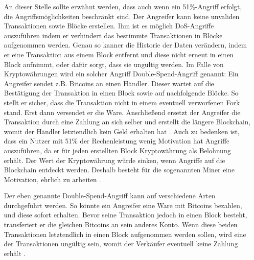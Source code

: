 An dieser Stelle sollte erwähnt werden, dass auch wenn ein 51\%-Angriff erfolgt, die Angriffsmöglichkeiten beschränkt sind. Der Angreifer kann keine unvaliden Transaktionen sowie Blöcke erstellen. Ihm ist es möglich DoS-Angriffe auszuführen indem er verhindert das bestimmte Transaktionen in Blöcke aufgenommen werden. Genau so kanner die Historie der Daten verändern, indem er eine Transaktion aus einem Block entfernt und diese nicht erneut in einen Block aufnimmt, oder dafür sorgt, dass sie ungültig werden. Im Falle von Kryptowährungen wird ein solcher Angriff Double-Spend-Angriff genannt: Ein Angreifer sendet z.B. Bitcoins an einen Händler. Dieser wartet auf die Bestätigung der Transaktion in einen Block sowie auf nachfolgende Blöcke. So stellt er sicher, dass die Transaktion nicht in einem eventuell verworfenen Fork stand. Erst dann versendet er die Ware. Anschließend ersetzt der Angreifer die Transaktion durch eine Zahlung an sich selber und erstellt die längere Blockchain, womit der Händler letztendlich kein Geld erhalten hat \cite{EthereumTeamEthereumWhitePaper2017}. Auch zu bedenken ist, dass ein Nutzer mit 51\% der Rechenleistung wenig Motivation hat Angriffe auszuführen, da er für jeden erstellten Block Kryptowährung als Belohnung erhält. Der Wert der Kryptowährung würde sinken, wenn Angriffe auf die Blockchain entdeckt werden. Deshalb besteht für die sogenannten Miner eine Motivation, ehrlich zu arbeiten \cite{AntonopoulosMasteringbitcoin2015}.

Der eben genannte Double-Spend-Angriff kann auf verschiedene Arten durchgeführt werden. So könnte ein Angreifer eine Ware mit Bitcoins bezahlen, und diese sofort erhalten. Bevor seine Transaktion jedoch in einen Block besteht, transferiert er die gleichen Bitcoins an sein anderes Konto. Wenn diese beiden Transaktionen letztendlich in einen Block aufgenommen werden sollen, wird eine der Transaktionen ungültig sein, womit der Verkäufer eventuell keine Zahlung erhält \cite{AntonopoulosMasteringbitcoin2015}.

